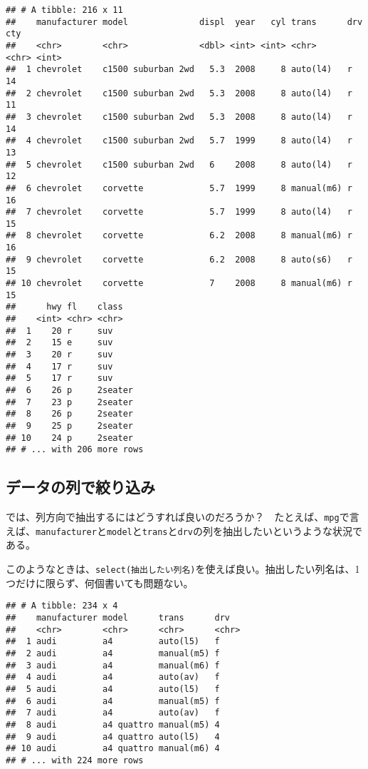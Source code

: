 \documentclass[]{book}
\newenvironment{Shaded}{\begin{snugshade}}{\end{snugshade}}
\newcommand{\KeywordTok}[1]{\textcolor[rgb]{0.13,0.29,0.53}{\textbf{#1}}}
\newcommand{\StringTok}[1]{\textcolor[rgb]{0.31,0.60,0.02}{#1}}
\newcommand{\CommentTok}[1]{\textcolor[rgb]{0.56,0.35,0.01}{\textit{#1}}}
\newcommand{\OperatorTok}[1]{\textcolor[rgb]{0.81,0.36,0.00}{\textbf{#1}}}
\newcommand{\NormalTok}[1]{#1}
\begin{document}
\begin{verbatim}
## # A tibble: 216 x 11
##    manufacturer model              displ  year   cyl trans      drv     cty
##    <chr>        <chr>              <dbl> <int> <int> <chr>      <chr> <int>
##  1 chevrolet    c1500 suburban 2wd   5.3  2008     8 auto(l4)   r        14
##  2 chevrolet    c1500 suburban 2wd   5.3  2008     8 auto(l4)   r        11
##  3 chevrolet    c1500 suburban 2wd   5.3  2008     8 auto(l4)   r        14
##  4 chevrolet    c1500 suburban 2wd   5.7  1999     8 auto(l4)   r        13
##  5 chevrolet    c1500 suburban 2wd   6    2008     8 auto(l4)   r        12
##  6 chevrolet    corvette             5.7  1999     8 manual(m6) r        16
##  7 chevrolet    corvette             5.7  1999     8 auto(l4)   r        15
##  8 chevrolet    corvette             6.2  2008     8 manual(m6) r        16
##  9 chevrolet    corvette             6.2  2008     8 auto(s6)   r        15
## 10 chevrolet    corvette             7    2008     8 manual(m6) r        15
##      hwy fl    class  
##    <int> <chr> <chr>  
##  1    20 r     suv    
##  2    15 e     suv    
##  3    20 r     suv    
##  4    17 r     suv    
##  5    17 r     suv    
##  6    26 p     2seater
##  7    23 p     2seater
##  8    26 p     2seater
##  9    25 p     2seater
## 10    24 p     2seater
## # ... with 206 more rows
\end{verbatim}

\subsection{データの列で絞り込み}

では、列方向で抽出するにはどうすれば良いのだろうか？　たとえば、\texttt{mpg}で言えば、\texttt{manufacturer}と\texttt{model}と\texttt{trans}と\texttt{drv}の列を抽出したいというような状況である。

このようなときは、\texttt{select(抽出したい列名)}を使えば良い。抽出したい列名は、1つだけに限らず、何個書いても問題ない。

\begin{Shaded}
\end{Shaded}

\begin{verbatim}
## # A tibble: 234 x 4
##    manufacturer model      trans      drv  
##    <chr>        <chr>      <chr>      <chr>
##  1 audi         a4         auto(l5)   f    
##  2 audi         a4         manual(m5) f    
##  3 audi         a4         manual(m6) f    
##  4 audi         a4         auto(av)   f    
##  5 audi         a4         auto(l5)   f    
##  6 audi         a4         manual(m5) f    
##  7 audi         a4         auto(av)   f    
##  8 audi         a4 quattro manual(m5) 4    
##  9 audi         a4 quattro auto(l5)   4    
## 10 audi         a4 quattro manual(m6) 4    
## # ... with 224 more rows
\end{verbatim}
\end{document}
